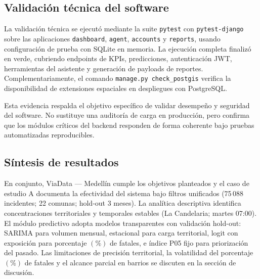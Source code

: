 \clearpage

\subsection{Validación técnica del software}

La validación técnica se ejecutó mediante la suite \texttt{pytest} con \texttt{pytest-django} sobre las aplicaciones \texttt{dashboard}, \texttt{agent}, \texttt{accounts} y \texttt{reports}, usando configuración de prueba con SQLite en memoria. La ejecución completa finalizó en verde, cubriendo endpoints de KPIs, predicciones, autenticación JWT, herramientas del asistente y generación de payloads de reportes. Complementariamente, el comando \texttt{manage.py check\_postgis} verifica la disponibilidad de extensiones espaciales en despliegues con PostgreSQL.

Esta evidencia respalda el objetivo específico de validar desempeño y seguridad del software. No sustituye una auditoría de carga en producción, pero confirma que los módulos críticos del backend responden de forma coherente bajo pruebas automatizadas reproducibles.

\subsection{Síntesis de resultados}

En conjunto, ViaData — Medellín cumple los objetivos planteados y el caso de estudio A documenta la efectividad del sistema bajo filtros unificados (75\,088 incidentes; 22 comunas; hold-out 3 meses). La analítica descriptiva identifica concentraciones territoriales y temporales estables (La Candelaria; martes 07:00). El módulo predictivo adopta modelos transparentes con validación hold-out: SARIMA para volumen mensual, estacional para carga territorial, logit con exposición para porcentaje $(\%)$ de fatales, e índice P05 fijo para priorización del pasado. Las limitaciones de precisión territorial, la volatilidad del porcentaje $(\%)$ de fatales y el alcance parcial en barrios se discuten en la sección de discusión.
